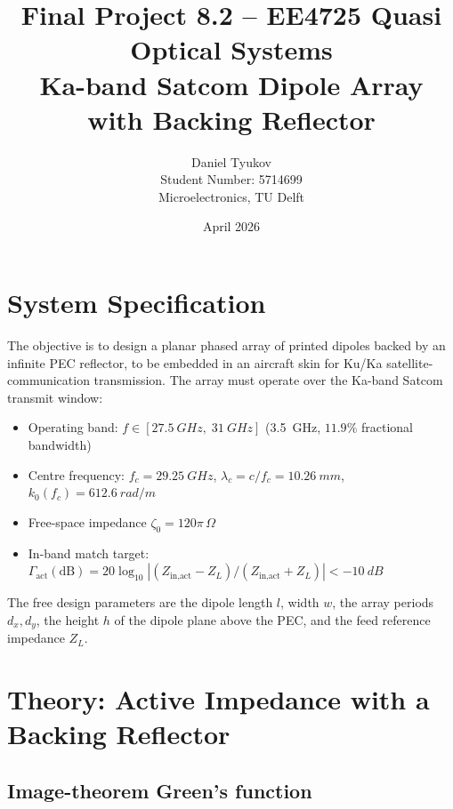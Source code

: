 \documentclass{article}
\title{Final Project 8.2 -- EE4725 Quasi Optical Systems\\
       Ka-band Satcom Dipole Array with Backing Reflector}
\author{Daniel Tyukov \\ Student Number: 5714699 \\ Microelectronics, TU Delft}
\date{April 2026}
\begin{document}
\maketitle

\tableofcontents
\newpage

\section{System Specification}

The objective is to design a planar phased array of printed dipoles backed by an infinite PEC reflector, to be embedded in an aircraft skin for Ku/Ka satellite-communication transmission. The array must operate over the Ka-band Satcom transmit window:
\begin{itemize}
\item Operating band: $f \in [\SI{27.5}{GHz},\;\SI{31}{GHz}]$ (\SI{3.5}{GHz}, $11.9\%$ fractional bandwidth)
\item Centre frequency: $f_c = \SI{29.25}{GHz}$, $\lambda_c = c/f_c = \SI{10.26}{mm}$, $k_0(f_c) = \SI{612.6}{rad/m}$
\item Free-space impedance $\zeta_0 = 120\pi\,\Omega$
\item In-band match target: $\Gamma_{\text{act}}(\mathrm{dB}) = 20\log_{10}\!\left|(Z_{\text{in,act}}-Z_L)/(Z_{\text{in,act}}+Z_L)\right| < \SI{-10}{dB}$
\end{itemize}

The free design parameters are the dipole length $l$, width $w$, the array periods $d_x,d_y$, the height $h$ of the dipole plane above the PEC, and the feed reference impedance $Z_L$.

\section{Theory: Active Impedance with a Backing Reflector}

\subsection{Image-theorem Green's function}
\end{document}

